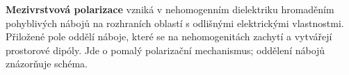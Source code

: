 \textbf{Mezivrstvová polarizace} vzniká v nehomogenním dielektriku hromaděním pohyblivých nábojů na rozhraních oblastí s odlišnými elektrickými vlastnostmi. Přiložené pole oddělí náboje, které se na nehomogenitách zachytí a vytvářejí prostorové dipóly. Jde o pomalý polarizační mechanismus; oddělení nábojů znázorňuje schéma.
